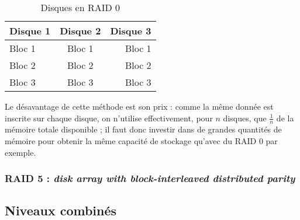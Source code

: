 \begin{table}[h]
    \centering
    \caption{\label{striping} Disques en RAID 0}
    \begin{tabular}{|l|c|r|}
        \hline
        \textbf{Disque 1} & \textbf{Disque 2} & \textbf{Disque 3} \\
        \hline
        Bloc 1 & Bloc 1 & Bloc 1 \\
        \hline
        Bloc 2 & Bloc 2 & Bloc 2 \\
        \hline
        Bloc 3 & Bloc 3 & Bloc 3 \\
        \hline
    \end{tabular}
\end{table}

Le désavantage de cette méthode est son prix : comme la même donnée est inscrite sur chaque disque, on n'utilise effectivement, pour $n$ disques, que $\frac{1}{n}$ de la mémoire totale disponible ; il faut donc investir dans de grandes quantités de mémoire pour obtenir la même capacité de stockage qu'avec du RAID 0 par exemple.

\subsubsection{RAID 5 : \textit{disk array with block-interleaved distributed parity}}

\subsection{Niveaux combinés}